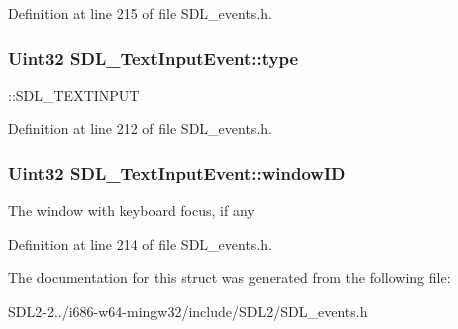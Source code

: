 Definition at line 215 of file S\+D\+L\+\_\+events.\+h.

\hypertarget{structSDL__TextInputEvent_a90576be2ea52e694deff40d0586654f5}{
\subsubsection[{type}]{\setlength{\rightskip}{0pt plus 5cm}Uint32 S\+D\+L\+\_\+\+Text\+Input\+Event\+::type}}\label{structSDL__TextInputEvent_a90576be2ea52e694deff40d0586654f5}
\+::\+S\+D\+L\+\_\+\+T\+E\+X\+T\+I\+N\+P\+U\+T 

Definition at line 212 of file S\+D\+L\+\_\+events.\+h.

\hypertarget{structSDL__TextInputEvent_aeb4f7a939353990ca40261ffbfbeb3d0}{
\subsubsection[{window\+I\+D}]{\setlength{\rightskip}{0pt plus 5cm}Uint32 S\+D\+L\+\_\+\+Text\+Input\+Event\+::window\+I\+D}}\label{structSDL__TextInputEvent_aeb4f7a939353990ca40261ffbfbeb3d0}
The window with keyboard focus, if any 

Definition at line 214 of file S\+D\+L\+\_\+events.\+h.



The documentation for this struct was generated from the following file\+:\begin{DoxyCompactItemize}
\item 
S\+D\+L2-\/2../i686-\/w64-\/mingw32/include/\+S\+D\+L2/S\+D\+L\+\_\+events.\+h\end{DoxyCompactItemize}
